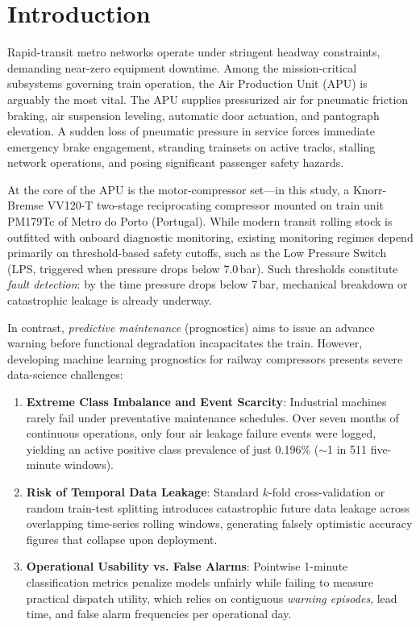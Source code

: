 \documentclass[10pt,twocolumn,a4paper]{article}
\begin{document}
\section{Introduction}
Rapid-transit metro networks operate under stringent headway constraints, demanding near-zero equipment downtime. Among the mission-critical subsystems governing train operation, the Air Production Unit (APU) is arguably the most vital. The APU supplies pressurized air for pneumatic friction braking, air suspension leveling, automatic door actuation, and pantograph elevation. A sudden loss of pneumatic pressure in service forces immediate emergency brake engagement, stranding trainsets on active tracks, stalling network operations, and posing significant passenger safety hazards.

At the core of the APU is the motor-compressor set---in this study, a Knorr-Bremse VV120-T two-stage reciprocating compressor mounted on train unit PM179Tc of Metro do Porto (Portugal). While modern transit rolling stock is outfitted with onboard diagnostic monitoring, existing monitoring regimes depend primarily on threshold-based safety cutoffs, such as the Low Pressure Switch (LPS, triggered when pressure drops below 7.0\,bar). Such thresholds constitute \textit{fault detection}: by the time pressure drops below 7\,bar, mechanical breakdown or catastrophic leakage is already underway. 

In contrast, \textit{predictive maintenance} (prognostics) aims to issue an advance warning before functional degradation incapacitates the train. However, developing machine learning prognostics for railway compressors presents severe data-science challenges:
\begin{enumerate}
    \item \textbf{Extreme Class Imbalance and Event Scarcity}: Industrial machines rarely fail under preventative maintenance schedules. Over seven months of continuous operations, only four air leakage failure events were logged, yielding an active positive class prevalence of just 0.196\% ($\sim$1 in 511 five-minute windows).
    \item \textbf{Risk of Temporal Data Leakage}: Standard $k$-fold cross-validation or random train-test splitting introduces catastrophic future data leakage across overlapping time-series rolling windows, generating falsely optimistic accuracy figures that collapse upon deployment.
    \item \textbf{Operational Usability vs. False Alarms}: Pointwise 1-minute classification metrics penalize models unfairly while failing to measure practical dispatch utility, which relies on contiguous \textit{warning episodes}, lead time, and false alarm frequencies per operational day.
\end{enumerate}
\end{document}
